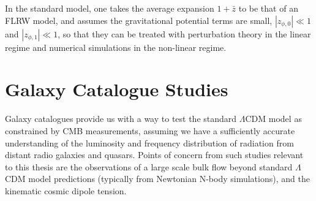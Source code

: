 \documentclass[a4paper,12pt]{report}
\begin{document}
In the standard model, one takes the average expansion $1+\bar{z}$ to be that of an FLRW model, and assumes the gravitational potential terms are small, $|z_{\phi,0}| \ll 1$ and $|z_{\phi,1}| \ll 1$, so that they can be treated with perturbation theory in the linear regime and numerical simulations in the non-linear regime.

\section{Galaxy Catalogue Studies}\label{section: galaxy catalogue studies}
Galaxy catalogues provide us with a way to test the standard $\Lambda$CDM model as constrained by CMB measurements, assuming we have a sufficiently accurate understanding of the luminosity and frequency distribution of radiation from distant radio galaxies and quasars. Points of concern from such studies relevant to this thesis are the observations of a large scale bulk flow beyond standard $\Lambda$CDM model predictions (typically from Newtonian N-body simulations), and the kinematic cosmic dipole tension.
\end{document}

